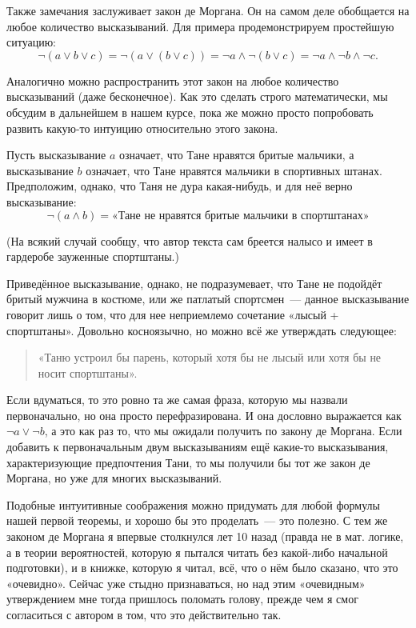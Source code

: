 Также замечания заслуживает закон де Моргана. Он на самом деле обобщается на любое количество высказываний. Для примера продемонстрируем простейшую ситуацию:
$$
\neg(a \lor b \lor c) = \neg(a \lor (b \lor c)) = \neg a \land \neg (b \lor c) = \neg a \land \neg b \land \neg c.
$$

Аналогично можно распространить этот закон на любое количество высказываний (даже бесконечное). Как это сделать строго математически, мы обсудим в дальнейшем в нашем курсе, пока же можно просто попробовать развить какую-то интуицию относительно этого закона.

Пусть высказывание $a$ означает, что Тане нравятся бритые мальчики, а высказывание $b$ означает, что Тане нравятся мальчики в спортивных штанах. Предположим, однако, что Таня не дура какая-нибудь, и для неё верно высказывание:
$$
\neg(a \land b) = \text{«Тане не нравятся бритые мальчики в спортштанах»}
$$

(На всякий случай сообщу, что автор текста сам бреется налысо и имеет в гардеробе зауженные спортштаны.)

Приведённое высказывание, однако, не подразумевает, что Тане не подойдёт бритый мужчина в костюме, или же патлатый спортсмен~--- данное высказывание говорит лишь о том, что для нее неприемлемо сочетание «лысый + спортштаны». Довольно косноязычно, но можно всё же утверждать следующее:

\begin{quote}
«Таню устроил бы парень, который хотя бы не лысый или хотя бы не носит спортштаны».
\end{quote}

Если вдуматься, то это ровно та же самая фраза, которую мы назвали первоначально, но она просто перефразирована. И она дословно выражается как $\neg a \lor \neg b$, а это как раз то, что мы ожидали получить по закону де Моргана. Если добавить к первоначальным двум высказываниям ещё какие-то высказывания, характеризующие предпочтения Тани, то мы получили бы тот же закон де Моргана, но уже для многих высказываний.

Подобные интуитивные соображения можно придумать для любой формулы нашей первой теоремы, и хорошо бы это проде\-лать~--- это полезно. С тем же законом де Моргана я впервые столкнулся лет 10 назад (правда не в мат. логике, а в теории вероятностей, которую я пытался читать без какой-либо начальной подготовки), и в книжке, которую я читал, всё, что о нём было сказано, что это «очевидно». Сейчас уже стыдно признаваться, но над этим «очевидным» утверждением мне тогда пришлось поломать голову, прежде чем я смог согласиться с автором в том, что это действительно так.

